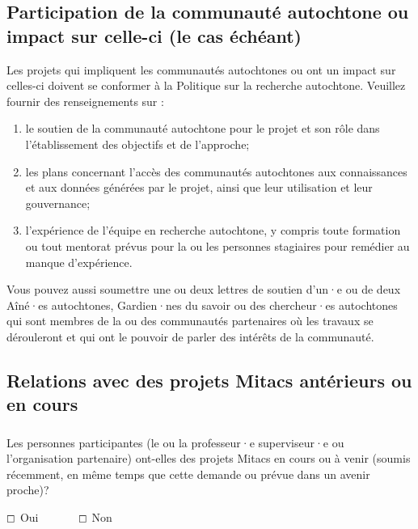 \documentclass{mitacs-acceleration}
\begin{document}

\subsection{Participation de la communauté autochtone ou impact sur celle-ci (le cas échéant)} %

\begin{instructions}
Les projets qui impliquent les communautés autochtones ou ont un impact sur celles-ci doivent se conformer à la Politique sur la recherche autochtone. 
Veuillez fournir des renseignements sur :

\begin{enumerate}[label=\alph*)]
\item le soutien de la communauté autochtone pour le projet et son rôle dans l'établissement des objectifs et de l'approche;
\item les plans concernant l'accès des communautés autochtones aux connaissances et aux données générées par le projet, ainsi que leur utilisation et leur gouvernance;
\item l'expérience de l'équipe en recherche autochtone, y compris toute formation ou tout mentorat prévus pour la ou les personnes stagiaires pour remédier au manque d'expérience.
\end{enumerate}

Vous pouvez aussi soumettre une ou deux lettres de soutien d'un·e ou de deux Aîné·es autochtones, Gardien·nes du savoir ou des chercheur·es autochtones qui sont membres de la ou des communautés partenaires où les travaux se dérouleront et qui ont le pouvoir de parler des intérêts de la communauté.
\end{instructions}


\subsection{Relations avec des projets Mitacs antérieurs ou en cours} %

\subsubsection{} Les personnes participantes (le ou la professeur·e superviseur·e ou l'organisation partenaire) ont-elles des projets Mitacs en cours ou à venir (soumis récemment, en même temps que cette demande ou prévue dans un avenir proche)?

$\boxempty$ Oui~~~~~~~$\boxempty$ Non
\end{document}
